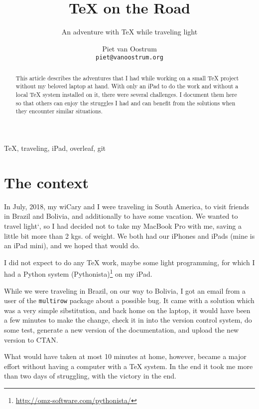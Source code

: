 \documentclass[nosubsub]{maps}
\begin{document}
\title{\TeX{} on the Road}

\subtitle{An adventure with \TeX{} while traveling light}

\author{%
  Piet van Oostrum\\
  \texttt{piet@vanoostrum.org}}

\maketitle

\begin{abstract}
This article describes the adventures that I had while working on a small \TeX{} project without my beloved laptop at hand. With only an iPad to do the work and without a local \TeX{} system installed on it, there were several challenges. I document them here so that others can enjoy the struggles I had and can benefit from the solutions when they encounter similar situations.
\end{abstract}

\begin{keywords}\TeX, traveling, iPad, overleaf, git
\end{keywords}

\section{The context}

In July, 2018, my wi\fe Cary and I were traveling in South America, to visit friends in Brazil and Bolivia, and additionally to have some vacation. We wanted to travel light`, so I had decided not to take my MacBook Pro with me, saving a little bit more than 2 kgs. of weight. We both had our iPhones and iPads (mine is an iPad mini), and we hoped that would do.

I did not expect to do any \TeX{} work, maybe some light programming, for which I had a Python system (Pythonista)\footnote{\url{http://omz-software.com/pythonista/}} on my iPad.

While we were traveling in Brazil, on our way to Bolivia, I got an email from a user of the \texttt{multirow} package about a possible bug. It came with a solution which was a very simple sibstitution, and back home on the laptop, it would have been a few minutes to make the change, check it in into the version control system, do some test, generate a new version of the documentation, and upload the new version to CTAN.

What would have taken at most 10 minutes at home, however, became a major effort without having a computer with a \TeX{} system. In the end it took me more than two days of struggling, with the victory in the end.
\end{document}
